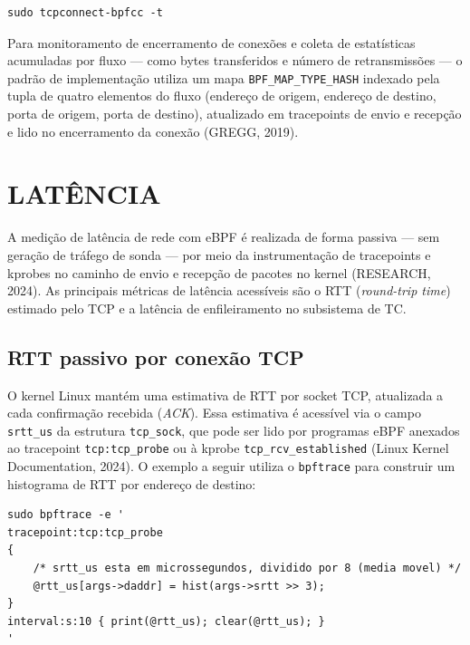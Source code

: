 \begin{lstlisting}[caption={Monitoramento de novas conexões TCP com tcpconnect-bpfcc.}, label=lst:obs-tcpconnect]
sudo tcpconnect-bpfcc -t
\end{lstlisting}

Para monitoramento de encerramento de conexões e coleta de estatísticas acumuladas
por fluxo — como bytes transferidos e número de retransmissões — o padrão de
implementação utiliza um mapa \texttt{BPF\_MAP\_TYPE\_HASH} indexado pela tupla de
quatro elementos do fluxo (endereço de origem, endereço de destino, porta de origem,
porta de destino), atualizado em tracepoints de envio e recepção e lido no encerramento
da conexão (GREGG, 2019).

\section{LATÊNCIA}

A medição de latência de rede com eBPF é realizada de forma passiva — sem geração
de tráfego de sonda — por meio da instrumentação de tracepoints e kprobes no caminho
de envio e recepção de pacotes no kernel (RESEARCH, 2024). As principais métricas de
latência acessíveis são o RTT (\textit{round-trip time}) estimado pelo TCP e a latência
de enfileiramento no subsistema de TC.

\subsection*{RTT passivo por conexão TCP}

O kernel Linux mantém uma estimativa de RTT por socket TCP, atualizada a cada
confirmação recebida (\textit{ACK}). Essa estimativa é acessível via o campo
\texttt{srtt\_us} da estrutura \texttt{tcp\_sock}, que pode ser lido por programas eBPF
anexados ao tracepoint \texttt{tcp:tcp\_probe} ou à kprobe \texttt{tcp\_rcv\_established}
(Linux Kernel Documentation, 2024). O exemplo a seguir utiliza o \texttt{bpftrace} para
construir um histograma de RTT por endereço de destino:

\begin{lstlisting}[caption={Histograma de RTT TCP passivo com bpftrace.}, label=lst:obs-rtt]
sudo bpftrace -e '
tracepoint:tcp:tcp_probe
{
    /* srtt_us esta em microssegundos, dividido por 8 (media movel) */
    @rtt_us[args->daddr] = hist(args->srtt >> 3);
}
interval:s:10 { print(@rtt_us); clear(@rtt_us); }
'
\end{lstlisting}

